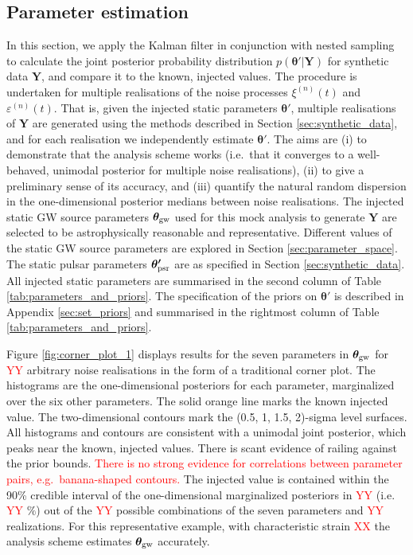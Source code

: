 \documentclass[fleqn,usenatbib,useAMS]{mnras}
\begin{document}
 
\subsection{Parameter estimation} \label{sec:pe_and_ms} 
In this section, we apply the Kalman filter in conjunction with nested sampling to calculate the joint posterior probability distribution $p({\boldsymbol{\theta'}} | {\boldsymbol{Y}})$ for synthetic data $\boldsymbol{Y}$, and compare it to the known, injected values. The procedure is undertaken for multiple realisations of the noise processes $\xi^{(n)}(t)$ and $\varepsilon^{(n)}(t)$. That is, given the injected static parameters $\boldsymbol{\theta'}$, multiple realisations of $\boldsymbol{Y}$ are generated using the methods described in Section \ref{sec:synthetic_data}, and for each realisation we independently estimate $\boldsymbol{\theta'}$. The aims are (i) to demonstrate that the analysis scheme works (i.e.\ that it converges to a well-behaved, unimodal posterior for multiple noise realisations), (ii) to give a preliminary sense of its accuracy, and (iii) quantify the natural random dispersion in the one-dimensional posterior medians between noise realisations. The injected static GW source parameters $\boldsymbol{\theta}_{\rm gw}$ used for this mock analysis to generate $\boldsymbol{Y}$ are selected to be astrophysically reasonable and representative. Different values of the static GW source parameters are explored in Section \ref{sec:parameter_space}. The static pulsar parameters $\boldsymbol{\theta'}_{\rm psr}$  are as specified in Section \ref{sec:synthetic_data}. All injected static parameters are summarised in the second column of Table \ref{tab:parameters_and_priors}. The specification of the priors on $\boldsymbol{\theta'}$ is described in Appendix \ref{sec:set_priors} and summarised in the rightmost column of Table \ref{tab:parameters_and_priors}. \newline




Figure \ref{fig:corner_plot_1} displays results for the seven parameters in $\boldsymbol{\theta}_{\rm gw}$ for \textcolor{red}{YY} arbitrary noise realisations in the form of a traditional corner plot. The histograms are the one-dimensional posteriors for each parameter, marginalized over the six other parameters. The solid orange line marks the known injected value. The two-dimensional contours mark the (0.5, 1, 1.5, 2)-sigma level surfaces. All histograms and contours are consistent with a unimodal joint posterior, which peaks near the known, injected values. There is scant evidence of railing against the prior bounds. \textcolor{red}{There is no strong evidence for correlations between parameter pairs, e.g.\ banana-shaped contours.} The injected value is contained within the 90\% credible interval of the one-dimensional marginalized posteriors in \textcolor{red}{YY} (i.e. \textcolor{red}{YY} $\%$) out of the \textcolor{red}{YY} possible combinations of the seven parameters and \textcolor{red}{YY} realizations. For this representative example, with characteristic strain \textcolor{red}{XX} the analysis scheme estimates $\boldsymbol{\theta}_{\rm gw}$ accurately. \newline 
 
\end{document}
